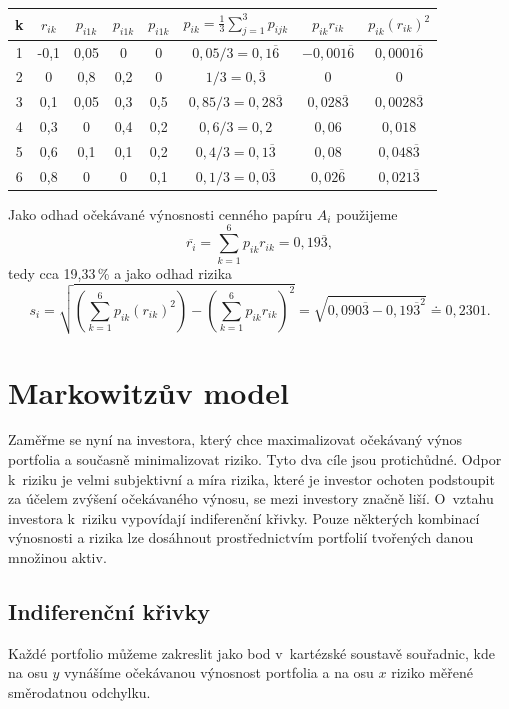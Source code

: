 \documentclass[12pt,a4paper]{report}
\begin{document}
\begin{center}
\setlength{\tabcolsep}{9pt}
\setlength{\extrarowheight}{4pt}
\begin{tabular}{|c|c|c|c|c|c|c|c|}
\hline k & $r_{ik}$ & $p_{i1k}$ & $p_{i1k}$ & $p_{i1k}$ &  $p_{ik}=\frac{1}{3}\sum_{j=1}^3 p_{ijk}$ &$p_{ik}r_{ik}$ & $p_{ik}(r_{ik})^2$\\ 
\hline 1 & -0,1 & 0,05 & 0   & 0   & $0,05/3 = 0,1\overline{6}$  & $-0,001\overline{6}$ & $0,0001\overline{6}$\\ 
\hline 2 &  0   & 0,8  & 0,2 & 0   & $1/3 = 0,\overline{3}$      & $0$ & $0$ \\ 
\hline 3 &  0,1 & 0,05 & 0,3 & 0,5 & $0,85/3 = 0,28\overline{3}$ & $0,028\overline{3}$& $0,0028\overline{3}$\\ 
\hline 4 &  0,3 & 0    & 0,4 & 0,2 & $0,6/3 = 0,2$               & $0,06$& $0,018$\\
\hline 5 &  0,6 & 0,1  & 0,1 & 0,2 & $0,4/3 = 0,1\overline{3}$   & $0,08$& $0,048\overline{3}$\\
\hline 6 &  0,8 & 0    & 0   & 0,1 & $0,1/3 = 0,0\overline{3}$   & $0,02\overline{6}$& $0,021\overline{3}$\\
\hline 
\end{tabular}  
\end{center}
Jako odhad očekávané výnosnosti cenného papíru $A_i$ použijeme
\[
\overline{r_i}=\sum_{k=1}^6 p_{ik}r_{ik}=0,19\overline{3},
\]
tedy cca 19,33\,\% a jako odhad rizika
\[
s_i=\sqrt{\left(\sum_{k=1}^6 p_{ik}\left(r_{ik}\right)^2\right) - \left(\sum_{k=1}^6 p_{ik}r_{ik}\right)^2}=\sqrt{0,090\overline{3}-0,19\overline{3}^2} \doteq 0,2301.
\]

\newpage
\section{Markowitzův model \label{markmod}} 
Zaměřme se nyní na investora, který chce maximalizovat očekávaný výnos portfolia a současně minimalizovat riziko. Tyto dva cíle jsou protichůdné.  Odpor k~riziku je velmi subjektivní a míra rizika, které je investor ochoten podstoupit za účelem zvýšení očekávaného výnosu, se mezi investory značně liší. O~vztahu investora k~riziku vypovídají indiferenční křivky. Pouze některých kombinací výnosnosti a rizika lze dosáhnout prostřednictvím portfolií tvořených danou množinou aktiv. 

\subsection{Indiferenční křivky}
Každé portfolio můžeme zakreslit jako bod v~kartézské soustavě souřadnic, kde na osu $y$ vynášíme očekávanou výnosnost portfolia a na osu $x$ riziko měřené směrodatnou odchylku. 
\end{document}
